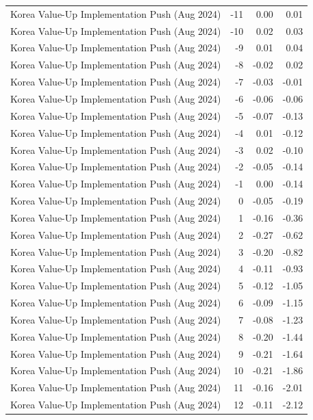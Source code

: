 \begin{table}
\begin{tabular}{lrrr}
Korea Value-Up Implementation Push (Aug 2024) & -11 & 0.00 & 0.01 \\
Korea Value-Up Implementation Push (Aug 2024) & -10 & 0.02 & 0.03 \\
Korea Value-Up Implementation Push (Aug 2024) & -9 & 0.01 & 0.04 \\
Korea Value-Up Implementation Push (Aug 2024) & -8 & -0.02 & 0.02 \\
Korea Value-Up Implementation Push (Aug 2024) & -7 & -0.03 & -0.01 \\
Korea Value-Up Implementation Push (Aug 2024) & -6 & -0.06 & -0.06 \\
Korea Value-Up Implementation Push (Aug 2024) & -5 & -0.07 & -0.13 \\
Korea Value-Up Implementation Push (Aug 2024) & -4 & 0.01 & -0.12 \\
Korea Value-Up Implementation Push (Aug 2024) & -3 & 0.02 & -0.10 \\
Korea Value-Up Implementation Push (Aug 2024) & -2 & -0.05 & -0.14 \\
Korea Value-Up Implementation Push (Aug 2024) & -1 & 0.00 & -0.14 \\
Korea Value-Up Implementation Push (Aug 2024) & 0 & -0.05 & -0.19 \\
Korea Value-Up Implementation Push (Aug 2024) & 1 & -0.16 & -0.36 \\
Korea Value-Up Implementation Push (Aug 2024) & 2 & -0.27 & -0.62 \\
Korea Value-Up Implementation Push (Aug 2024) & 3 & -0.20 & -0.82 \\
Korea Value-Up Implementation Push (Aug 2024) & 4 & -0.11 & -0.93 \\
Korea Value-Up Implementation Push (Aug 2024) & 5 & -0.12 & -1.05 \\
Korea Value-Up Implementation Push (Aug 2024) & 6 & -0.09 & -1.15 \\
Korea Value-Up Implementation Push (Aug 2024) & 7 & -0.08 & -1.23 \\
Korea Value-Up Implementation Push (Aug 2024) & 8 & -0.20 & -1.44 \\
Korea Value-Up Implementation Push (Aug 2024) & 9 & -0.21 & -1.64 \\
Korea Value-Up Implementation Push (Aug 2024) & 10 & -0.21 & -1.86 \\
Korea Value-Up Implementation Push (Aug 2024) & 11 & -0.16 & -2.01 \\
Korea Value-Up Implementation Push (Aug 2024) & 12 & -0.11 & -2.12 \\

\end{tabular}
\end{table}
